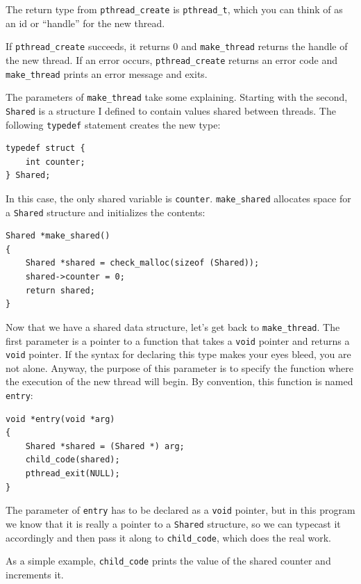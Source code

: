 \documentclass[12pt]{book}
\begin{document}
{%

The return type from \verb"pthread_create" is \verb"pthread_t",
which you can think of as an id or ``handle'' for the new thread.  

If {\tt pthread\_create} succeeds, it returns 0 and \verb"make_thread"
returns the handle of the new thread.
If an error occurs, {\tt pthread\_create} 
returns an error code and \verb"make_thread" prints an error message
and exits.

The parameters of \verb"make_thread" take some
explaining.  Starting with the second, {\tt Shared}
is a structure I defined to contain values shared between threads.
The following {\tt typedef} statement creates the new type:

\begin{verbatim}
typedef struct {
    int counter;
} Shared;
\end{verbatim}

In this case, the only shared variable is {\tt counter}.
{\tt make\_shared} allocates
space for a {\tt Shared} structure and initializes the contents:

\begin{verbatim}
Shared *make_shared()
{
    Shared *shared = check_malloc(sizeof (Shared));
    shared->counter = 0;
    return shared;
}
\end{verbatim}

Now that we have a shared data structure, let's get back to
\verb"make_thread".
The first parameter is a pointer to a function that takes
a {\tt void} pointer and returns a {\tt void} pointer.  If the syntax
for declaring this type makes your eyes bleed, you are not alone.
Anyway, the purpose of this parameter is to specify the function where
the execution of the new thread will begin.  By convention, this
function is named {\tt entry}:

\begin{verbatim}
void *entry(void *arg)
{
    Shared *shared = (Shared *) arg;
    child_code(shared);
    pthread_exit(NULL);
}
\end{verbatim}

The parameter of {\tt entry} has to be declared as a {\tt void}
pointer, but in this program we know that it is really a pointer to a
{\tt Shared} structure, so we can typecast it accordingly and then
pass it along to {\tt child\_code}, which does the real work.

As a simple example, \verb"child_code" prints the value of
the shared counter and increments it.

}
\end{document}
